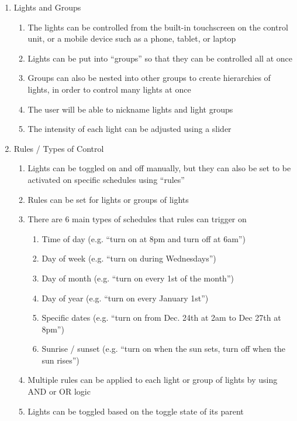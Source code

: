 \begin{enumerate}
    \item Lights and Groups
    \begin{enumerate}
        \item The lights can be controlled from the built-in touchscreen on the
            control unit, or a mobile device such as a phone, tablet, or laptop
        \item Lights can be put into ``groups'' so that they can be controlled
            all at once
        \item Groups can also be nested into other groups to create hierarchies
            of lights, in order to control many lights at once
        \item The user will be able to nickname lights and light groups
        \item The intensity of each light can be adjusted using a slider
    \end{enumerate}
    \item Rules / Types of Control
    \begin{enumerate}
        \item Lights can be toggled on and off manually, but they can also be
            set to be activated on specific schedules using ``rules''
        \item Rules can be set for lights or groups of lights
        \item There are 6 main types of schedules that rules can trigger on
        \begin{enumerate}
            \item Time of day (e.g. ``turn on at 8pm and turn off at 6am'')
            \item Day of week (e.g. ``turn on during Wednesdays'')
            \item Day of month (e.g. ``turn on every 1st of the month'')
            \item Day of year (e.g. ``turn on every January 1st'')
            \item Specific dates (e.g. ``turn on from Dec. 24th at 2am to Dec
                27th at 8pm'')
            \item Sunrise / sunset (e.g. ``turn on when the sun sets, turn off
                when the sun rises'')
        \end{enumerate}
        \item Multiple rules can be applied to each light or group of lights by
            using AND or OR logic
        \item Lights can be toggled based on the toggle state of its parent

\end{enumerate}
\end{enumerate}

